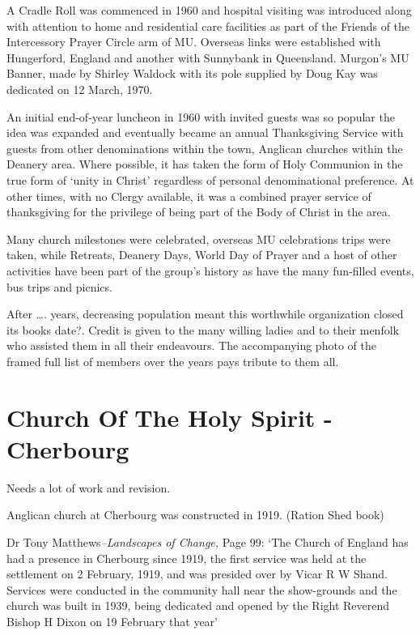 A Cradle Roll was commenced in 1960 and hospital visiting was introduced along with attention to home and residential care facilities as part of the Friends of the Intercessory Prayer Circle arm of MU. Overseas links were established with Hungerford, England and another with Sunnybank in Queensland. Murgon's MU Banner, made by Shirley Waldock with its pole supplied by Doug Kay was dedicated on 12 March, 1970.



An initial end-of-year luncheon in 1960 with invited guests was so popular the idea was expanded and eventually became an annual Thanksgiving Service with guests from other denominations within the town, Anglican churches within the Deanery area. Where possible, it has taken the form of Holy Communion in the true form of `unity in Christ' regardless of personal denominational preference. At other times, with no Clergy available, it was a combined prayer service of thanksgiving for the privilege of being part of the Body of Christ in the area.



Many church milestones were celebrated, overseas MU celebrations trips were taken, while Retreats, Deanery Days, World Day of Prayer and a host of other activities have been part of the group's history as have the many fun-filled events, bus trips and picnics.



After \ldots. years, decreasing population meant this worthwhile organization closed its books date?. Credit is given to the many willing ladies and to their menfolk who assisted them in all their endeavours. The accompanying photo of the framed full list of members over the years pays tribute to them all.



\section{Church Of The Holy Spirit - Cherbourg}



Needs a lot of work and revision.



Anglican church at Cherbourg was constructed in 1919. (Ration Shed book)



Dr Tony Matthews\emph{--Landscapes of Change,} Page 99: `The Church of England has had a presence in Cherbourg since 1919, the first service was held at the settlement on 2 February, 1919, and was presided over by Vicar R W Shand. Services were conducted in the community hall near the show-grounds and the church was built in 1939, being dedicated and opened by the Right Reverend Bishop H Dixon on 19 February that year'

